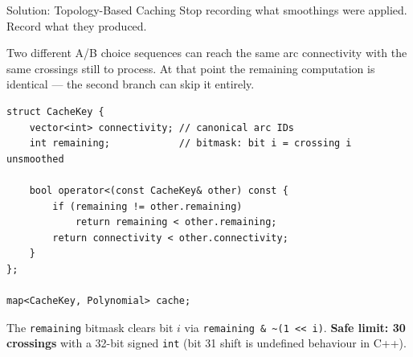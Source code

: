 \documentclass[final]{beamer}
\newlength{\colwidth}
\begin{document}
\begin{frame}[t,fragile]
\begin{columns}[t]
\begin{column}{\colwidth}
\begin{exampleblock}{Solution: Topology-Based Caching}
    Stop recording what smoothings were applied. Record what they produced.

    \vspace{0.1cm}
    Two different A/B choice sequences can reach the same arc connectivity with the same crossings still to process. At that point the remaining computation is identical --- the second branch can skip it entirely.

    \vspace{0.1cm}
    \begin{center}
    \end{center}

    \vspace{0.1cm}

\begin{lstlisting}
struct CacheKey {
    vector<int> connectivity; // canonical arc IDs
    int remaining;            // bitmask: bit i = crossing i unsmoothed

    bool operator<(const CacheKey& other) const {
        if (remaining != other.remaining)
            return remaining < other.remaining;
        return connectivity < other.connectivity;
    }
};

map<CacheKey, Polynomial> cache;
\end{lstlisting}

    \vspace{0.1cm}
    The \texttt{remaining} bitmask clears bit $i$ via \texttt{remaining \& \textasciitilde(1 << i)}. \textbf{Safe limit: 30 crossings} with a 32-bit signed \texttt{int} (bit 31 shift is undefined behaviour in C++).
  \end{exampleblock}


\end{column}
\end{columns}
\end{frame}
\end{document}
